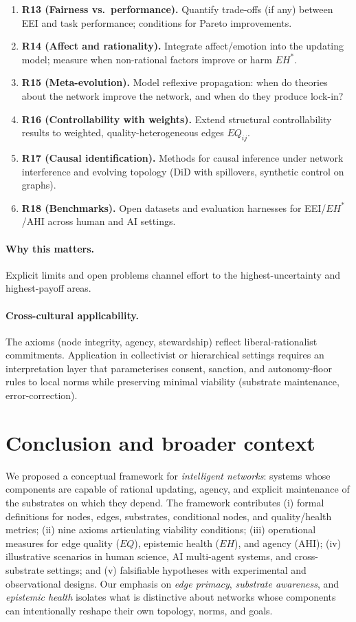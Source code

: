 \documentclass[12pt]{article}
\begin{document}
\begin{enumerate}[leftmargin=1.2em]
\item \textbf{R13 (Fairness vs.\ performance).} Quantify trade-offs (if any) between EEI and task performance; conditions for Pareto improvements.
\item \textbf{R14 (Affect and rationality).} Integrate affect/emotion into the updating model; measure when non-rational factors improve or harm $EH^{\ast}$.
\item \textbf{R15 (Meta-evolution).} Model reflexive propagation: when do theories about the network improve the network, and when do they produce lock-in?
\item \textbf{R16 (Controllability with weights).} Extend structural controllability results to weighted, quality-heterogeneous edges $EQ_{ij}$.
\item \textbf{R17 (Causal identification).} Methods for causal inference under network interference and evolving topology (DiD with spillovers, synthetic control on graphs).
\item \textbf{R18 (Benchmarks).} Open datasets and evaluation harnesses for EEI/$EH^{\ast}$/AHI across human and AI settings.
\end{enumerate}

\paragraph{Why this matters.} Explicit limits and open problems channel effort to the highest-uncertainty and highest-payoff areas.

\paragraph{Cross-cultural applicability.} The axioms (node integrity, agency, stewardship) reflect liberal-rationalist commitments. Application in collectivist or hierarchical settings requires an interpretation layer that parameterises consent, sanction, and autonomy-floor rules to local norms while preserving minimal viability (substrate maintenance, error-correction).
\section{Conclusion and broader context}
We proposed a conceptual framework for \emph{intelligent networks}: systems whose components are capable of rational updating, agency, and explicit maintenance of the substrates on which they depend. The framework contributes (i) formal definitions for nodes, edges, substrates, conditional nodes, and quality/health metrics; (ii) nine axioms articulating viability conditions; (iii) operational measures for edge quality ($EQ$), epistemic health ($EH$), and agency (AHI); (iv) illustrative scenarios in human science, AI multi-agent systems, and cross-substrate settings; and (v) falsifiable hypotheses with experimental and observational designs. Our emphasis on \emph{edge primacy}, \emph{substrate awareness}, and \emph{epistemic health} isolates what is distinctive about networks whose components can intentionally reshape their own topology, norms, and goals.
\end{document}
